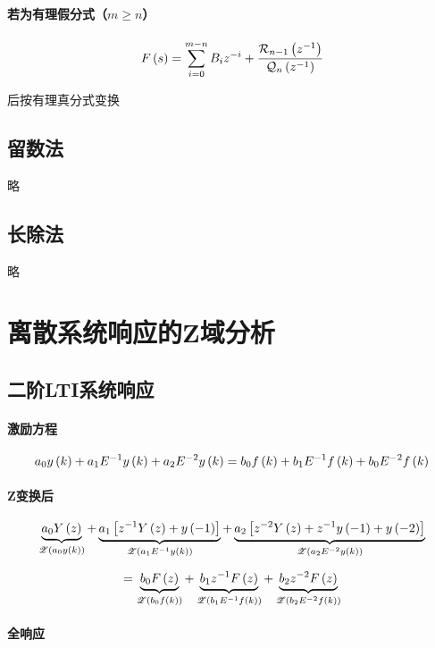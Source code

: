 \documentclass{article}
\begin{document}
\paragraph{若为有理假分式（$m\geqslant n$）}

\[F\left(s\right)=\sum_{i=0}^{m-n}B_iz^{-i}+\frac{\mathcal R_{n-1}\left(z^{-1}\right)}{\mathcal Q_n\left(z^{-1}\right)}\]

后按有理真分式变换

\subsection{留数法}

略

\subsection{长除法}

略

\section{离散系统响应的Z域分析}

\subsection{二阶LTI系统响应}

\paragraph{激励方程}

\[a_0y\left(k\right)+a_1E^{-1}y\left(k\right)+a_2E^{-2}y\left(k\right)
    =b_0f\left(k\right)+b_1E^{-1}f\left(k\right)+b_0E^{-2}f\left(k\right)\]

\paragraph{Z变换后}

\[\underbrace{a_0Y\left(z\right)}_{\mathscr Z\left(a_0y\left(k\right)\right)}
    +\underbrace{a_1\left[{z^{-1}Y\left(z\right)+y\left(-1\right)}\right]}_{\mathscr Z\left(a_1E^{-1}y\left(k\right)\right)}
    +\underbrace{a_2\left[{z^{-2}Y\left(z\right)+z^{-1}y\left(-1\right)+y\left(-2\right)}\right]}_{\mathscr Z\left(a_2E^{-2}y\left(k\right)\right)}\]

\[=\underbrace{b_0F\left(z\right)}_{\mathscr Z\left(b_0f\left(k\right)\right)}
    +\underbrace{b_1z^{-1}F\left(z\right)}_{\mathscr Z\left(b_1E^{-1}f\left(k\right)\right)}
    +\underbrace{b_2z^{-2}F\left(z\right)}_{\mathscr Z\left(b_2E^{-2}f\left(k\right)\right)}\]

\paragraph{全响应}
\end{document}
